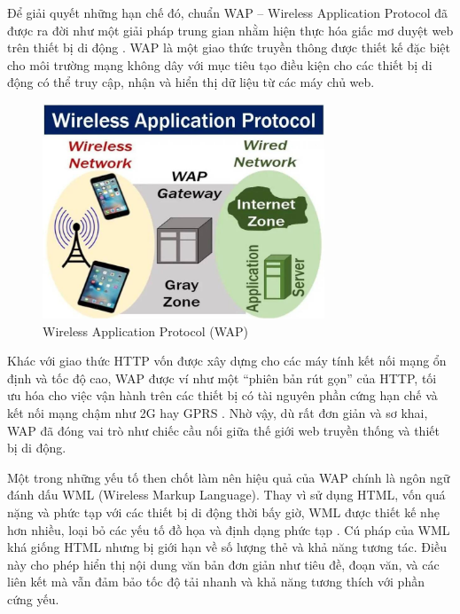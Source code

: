   \begin{flushleft}
  \hspace*{0.8cm}Để giải quyết những hạn chế đó, chuẩn WAP – Wireless Application Protocol đã được ra đời như một giải pháp trung gian nhằm hiện thực hóa giấc mơ duyệt web trên thiết bị di động \cite{wap-intro}. WAP là một giao thức truyền thông được thiết kế đặc biệt cho môi trường mạng không dây với mục tiêu tạo điều kiện cho các thiết bị di động có thể truy cập, nhận và hiển thị dữ liệu từ các máy chủ web.
  \end{flushleft}

\begin{figure}[h]
  \centering
  \includegraphics[width=0.75\textwidth]{images/Wireless-Application-Protocol-WAP-la-gi.jpg}
  \caption{Wireless Application Protocol (WAP)}
  \label{fig:fig7}
\end{figure}
  
  \begin{flushleft}
  \hspace*{0.8cm}Khác với giao thức HTTP vốn được xây dựng cho các máy tính kết nối mạng ổn định và tốc độ cao, WAP được ví như một “phiên bản rút gọn” của HTTP, tối ưu hóa cho việc vận hành trên các thiết bị có tài nguyên phần cứng hạn chế và kết nối mạng chậm như 2G hay GPRS \cite{wap-vs-http}. Nhờ vậy, dù rất đơn giản và sơ khai, WAP đã đóng vai trò như chiếc cầu nối giữa thế giới web truyền thống và thiết bị di động.
  \end{flushleft}
  
  \begin{flushleft}
  \hspace*{0.8cm}Một trong những yếu tố then chốt làm nên hiệu quả của WAP chính là ngôn ngữ đánh dấu WML (Wireless Markup Language). Thay vì sử dụng HTML, vốn quá nặng và phức tạp với các thiết bị di động thời bấy giờ, WML được thiết kế nhẹ hơn nhiều, loại bỏ các yếu tố đồ họa và định dạng phức tạp \cite{wml-design}. Cú pháp của WML khá giống HTML nhưng bị giới hạn về số lượng thẻ và khả năng tương tác. Điều này cho phép hiển thị nội dung văn bản đơn giản như tiêu đề, đoạn văn, và các liên kết mà vẫn đảm bảo tốc độ tải nhanh và khả năng tương thích với phần cứng yếu.
  \end{flushleft}

